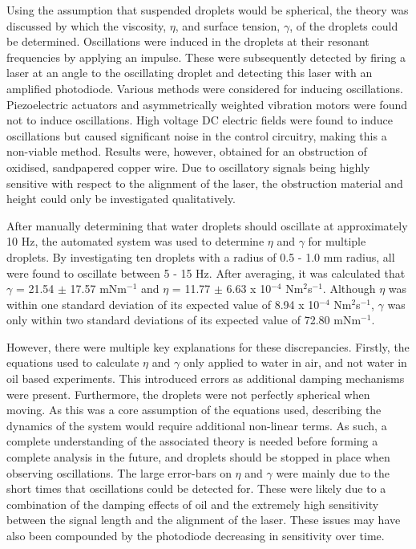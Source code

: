 \documentclass{physics_article_B}
\begin{document}
    Using the assumption that suspended droplets would be spherical, the theory was discussed by which the viscosity, $\eta$, and surface tension, $\gamma$, of the droplets could be determined. Oscillations were induced in the droplets at their resonant frequencies by applying an impulse. These were subsequently detected by firing a laser at an angle to the oscillating droplet and detecting this laser with an amplified photodiode. Various methods were considered for inducing oscillations. Piezoelectric actuators and asymmetrically weighted vibration motors were found not to induce oscillations. High voltage DC electric fields were found to induce oscillations but caused significant noise in the control circuitry, making this a non-viable method. Results were, however, obtained for an obstruction of oxidised, sandpapered copper wire. Due to oscillatory signals being highly sensitive with respect to the alignment of the laser, the obstruction material and height could only be investigated qualitatively. 
    
    After manually determining that water droplets should oscillate at approximately 10 Hz, the automated system was used to determine $\eta$ and $\gamma$ for multiple droplets. By investigating ten droplets with a radius of 0.5 - 1.0 mm radius, all were found to oscillate between 5 - 15 Hz. After averaging, it was calculated that $\gamma$ = 21.54 $\pm$ 17.57 mNm$^{-1}$ and $\eta$ = 11.77 $\pm$ 6.63 x 10$^{-4}$ Nm$^{2}$s$^{-1}$. Although $\eta$ was within one standard deviation of its expected value of \cite{expected2} 8.94 x 10$^{-4}$ Nm$^{2}$s$^{-1}$, $\gamma$ was only within two standard deviations of its expected value of\cite{expected1} 72.80 mNm$^{-1}$.
    
    However, there were multiple key explanations for these discrepancies. Firstly, the equations used to calculate $\eta$ and $\gamma$ only applied to water in air, and not water in oil based experiments. This introduced errors as additional damping mechanisms were present. Furthermore, the droplets were not perfectly spherical when moving. As this was a core assumption of the equations used, describing the dynamics of the system would require additional non-linear terms. As such, a complete understanding of the associated theory is needed before forming a complete analysis in the future, and droplets should be stopped in place when observing oscillations. The large error-bars on $\eta$ and $\gamma$ were mainly due to the short times that oscillations could be detected for. These were likely due to a combination of the damping effects of oil and the extremely high sensitivity between the signal length and the alignment of the laser. These issues may have also been compounded by the photodiode decreasing in sensitivity over time. 
    
\end{document}

